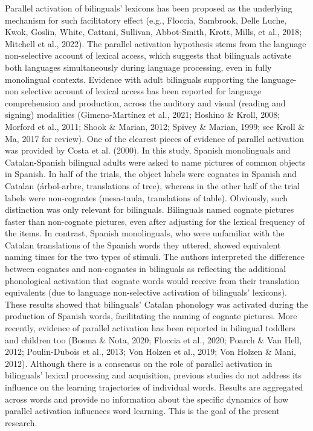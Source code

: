 \documentclass[
  12pt,
  b5paperpaper,
  twoside]{scrreprt}
\begin{document}
Parallel activation of bilinguals' lexicons has been proposed as the
underlying mechanism for such facilitatory effect (e.g., Floccia,
Sambrook, Delle Luche, Kwok, Goslin, White, Cattani, Sullivan,
Abbot-Smith, Krott, Mills, et al., 2018; Mitchell et al., 2022). The
parallel activation hypothesis stems from the language non-selective
account of lexical access, which suggests that bilinguals activate both
languages simultaneously during language processing, even in fully
monolingual contexts. Evidence with adult bilinguals supporting the
language-non selective account of lexical access has been reported for
language comprehension and production, across the auditory and visual
(reading and signing) modalities (Gimeno-Martínez et al., 2021; Hoshino
\& Kroll, 2008; Morford et al., 2011; Shook \& Marian, 2012; Spivey \&
Marian, 1999; see Kroll \& Ma, 2017 for review). One of the clearest
pieces of evidence of parallel activation was provided by Costa et al.
(2000). In this study, Spanish monolinguals and Catalan-Spanish
bilingual adults were asked to name pictures of common objects in
Spanish. In half of the trials, the object labels were cognates in
Spanish and Catalan (árbol-arbre, translations of tree), whereas in the
other half of the trial labels were non-cognates (mesa-taula,
translations of table). Obviously, such distinction was only relevant
for bilinguals. Bilinguals named cognate pictures faster than
non-cognate pictures, even after adjusting for the lexical frequency of
the items. In contrast, Spanish monolinguals, who were unfamiliar with
the Catalan translations of the Spanish words they uttered, showed
equivalent naming times for the two types of stimuli. The authors
interpreted the difference between cognates and non-cognates in
bilinguals as reflecting the additional phonological activation that
cognate words would receive from their translation equivalents (due to
language non-selective activation of bilinguals' lexicons). These
results showed that bilinguals' Catalan phonology was activated during
the production of Spanish words, facilitating the naming of cognate
pictures. More recently, evidence of parallel activation has been
reported in bilingual toddlers and children too (Bosma \& Nota, 2020;
Floccia et al., 2020; Poarch \& Van Hell, 2012; Poulin-Dubois et al.,
2013; Von Holzen et al., 2019; Von Holzen \& Mani, 2012). Although there
is a consensus on the role of parallel activation in bilinguals' lexical
processing and acquisition, previous studies do not address its
influence on the learning trajectories of individual words. Results are
aggregated across words and provide no information about the specific
dynamics of how parallel activation influences word learning. This is
the goal of the present research.
\end{document}
